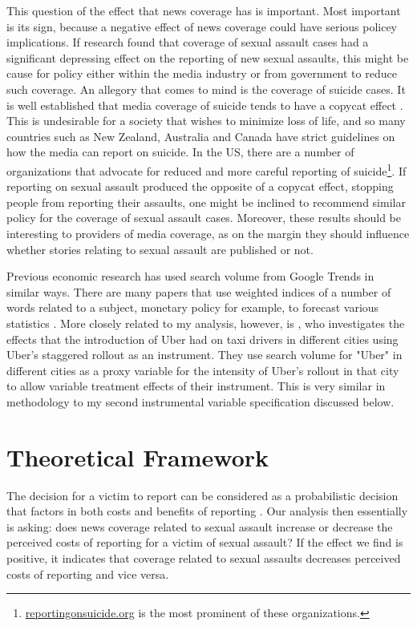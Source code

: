 \documentclass[AER,draftmode]{AEA}
\begin{document}
This question of the effect that news coverage has is important. Most important is its sign, because a negative effect of news coverage could have serious policey implications. If research found that coverage of sexual assault cases had a significant depressing effect on the reporting of new sexual assaults, this might be cause for policy either within the media industry or from government to reduce such coverage. An allegory that comes to mind is the coverage of suicide cases. It is well established that media coverage of suicide tends to have a copycat effect \cite{stack_media_2003}. This is undesirable for a society that wishes to minimize loss of life, and so many countries such as New Zealand, Australia and Canada have strict guidelines on how the media can report on suicide. In the US, there are a number of organizations that advocate for reduced and more careful reporting of suicide\footnote{\url{reportingonsuicide.org} is the most prominent of these organizations.}. If reporting on sexual assault produced the opposite of a copycat effect, stopping people from reporting their assaults, one might be inclined to recommend similar policy for the coverage of sexual assault cases. Moreover, these results should be interesting to providers of media coverage, as on the margin they should influence whether stories relating to sexual assault are published or not. 

Previous economic research has used search volume from Google Trends in similar ways. There are many papers that use weighted indices of a number of words related to a subject, monetary policy for example, to forecast various statistics \cite{wohlfarth_measuring_2018,yu_online_2019}. More closely related to my analysis, however, is , who investigates the effects that the introduction of Uber had on taxi drivers in different cities using Uber's staggered rollout as an instrument. They use search volume for "Uber" in different cities as a proxy variable for the intensity of Uber's rollout in that city to allow variable treatment effects of their instrument. This is very similar in methodology to my second instrumental variable specification discussed below.

\section{Theoretical Framework}

The decision for a victim to report can be considered as a probabilistic decision that factors in both costs and benefits of reporting \cite{allen_reporting_2007}. Our analysis then essentially is asking: does news coverage related to sexual assault increase or decrease the perceived costs of reporting for a victim of sexual assault? If the effect we find is positive, it indicates that coverage related to sexual assaults decreases perceived costs of reporting and vice versa.
\end{document}
